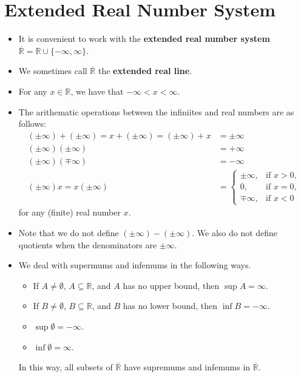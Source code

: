 \documentclass[10pt]{article}
\numberwithin{lemma}{section}
\newcommand{\Real}{\mathbb{R}}
\begin{document}
\section{Extended Real Number System}

\begin{itemize}
  \item It is convenient to work with the {\bf extended real number system} $\overline{\Real} = \Real \cup \{-\infty, \infty\}$.
 
  \item We sometimes call $\overline{\Real}$ the {\bf extended real line}.
  
  \item For any $x \in \Real$, we have that $-\infty < x < \infty$.
      
  \item The arithematic operations between the infiniites and real numbers are as follows:
  \begin{align*}
      (\pm \infty) + (\pm \infty) = x + (\pm \infty) = (\pm \infty) + x &= \pm \infty \\
      (\pm \infty) (\pm \infty) &= +\infty \\
      (\pm \infty) (\mp \infty) &= -\infty \\        
      (\pm \infty) x = x (\pm \infty) &= \begin{cases}
          \pm \infty, & \mbox{if } x > 0, \\
          0, &\mbox{if } x = 0, \\
          \mp \infty, & \mbox{if } x < 0
      \end{cases}        
  \end{align*}
  for any (finite) real number $x$.  
  \item Note that we do not define $(\pm \infty) - (\pm \infty)$. We also do not define quotients when the denominators are $\pm \infty$.  

  \item We deal with supermums and infemums in the following ways.
  \begin{itemize}
    \item If $A \neq \emptyset$, $A \subseteq \Real$, and $A$ has no upper bound, then $\sup A = \infty$.
    \item If $B \neq \emptyset$, $B \subseteq \Real$, and $B$ has no lower bound, then $\inf B = -\infty$.
    \item $\sup \emptyset = -\infty$.
    \item $\inf \emptyset = \infty$. 
  \end{itemize}
  In this way, all subsets of $\overline{\Real}$ have supremums and infemums in $\overline{\Real}$.
\end{itemize}
\end{document}
